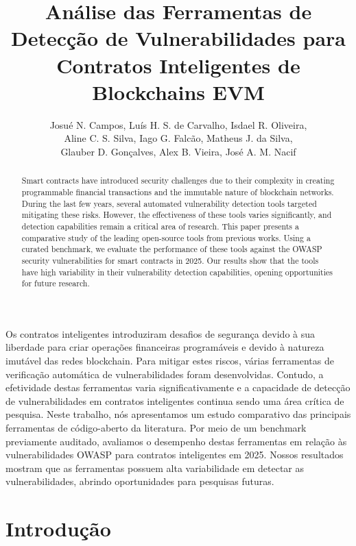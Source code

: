 \documentclass[12pt]{article}
\title{Análise das Ferramentas de Detecção de Vulnerabilidades para Contratos Inteligentes de Blockchains EVM}
\author{Josué N. Campos\inst{1}, Luís H. S. de Carvalho\inst{1}, Isdael R. Oliveira\inst{2}, \\Aline C. S. Silva\inst{1}, Iago G. Falcão\inst{1}, Matheus J. da Silva\inst{1}, \\Glauber D. Gonçalves\inst{2}, Alex B. Vieira\inst{3}, José A. M. Nacif\inst{1}}
\begin{document}
 

\maketitle

\begin{abstract}
Smart contracts have introduced security challenges due to their complexity in creating programmable financial transactions and the immutable nature of blockchain networks. During the last few years, several automated vulnerability detection tools targeted mitigating these risks. However, the effectiveness of these tools varies significantly, and detection capabilities remain a critical area of research. This paper presents a comparative study of the leading open-source tools from previous works. Using a curated benchmark, we evaluate the performance of these tools against the OWASP security vulnerabilities for smart contracts in 2025. Our results show that the tools have high variability in their vulnerability detection capabilities, opening opportunities for future research.
\end{abstract}
     
\begin{resumo} 
Os contratos inteligentes introduziram desafios de segurança devido à sua liberdade para criar operações financeiras programáveis e devido à natureza imutável das redes blockchain. Para mitigar estes riscos, várias ferramentas de verificação automática de vulnerabilidades foram desenvolvidas. Contudo, a efetividade destas ferramentas varia significativamente e a capacidade de detecção de vulnerabilidades em contratos inteligentes continua sendo uma área crítica de pesquisa. Neste trabalho, nós apresentamos um estudo comparativo das principais ferramentas de código-aberto da literatura. Por meio de um benchmark previamente auditado, avaliamos o desempenho destas ferramentas em relação às vulnerabilidades OWASP para contratos inteligentes em 2025. Nossos resultados mostram que as ferramentas possuem alta variabilidade em detectar as vulnerabilidades, abrindo oportunidades para pesquisas futuras.
\end{resumo}


\section{Introdução}\label{sec:introduction}
\end{document}
